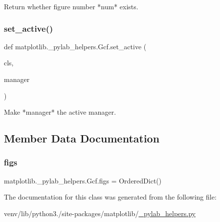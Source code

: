\begin{DoxyVerb}Return whether figure number *num* exists.\end{DoxyVerb}
 \mbox{\label{classmatplotlib_1_1__pylab__helpers_1_1Gcf_aef2f252452714001e349f445885b0716}} 
\subsubsection{\texorpdfstring{set\+\_\+active()}{set\_active()}}
{\footnotesize\ttfamily def matplotlib.\+\_\+pylab\+\_\+helpers.\+Gcf.\+set\+\_\+active (\begin{DoxyParamCaption}\item[{}]{cls,  }\item[{}]{manager }\end{DoxyParamCaption})}

\begin{DoxyVerb}Make *manager* the active manager.\end{DoxyVerb}
 

\subsection{Member Data Documentation}
\mbox{\label{classmatplotlib_1_1__pylab__helpers_1_1Gcf_ac1d16159d761b872a4840cb20b1a591d}} 
\subsubsection{\texorpdfstring{figs}{figs}}
{\footnotesize\ttfamily matplotlib.\+\_\+pylab\+\_\+helpers.\+Gcf.\+figs = Ordered\+Dict()\hspace{0.3cm}{\ttfamily [static]}}



The documentation for this class was generated from the following file\+:\begin{DoxyCompactItemize}
\item 
venv/lib/python3./site-\/packages/matplotlib/\hyperlink{__pylab__helpers_8py}{\+\_\+pylab\+\_\+helpers.\+py}\end{DoxyCompactItemize}
